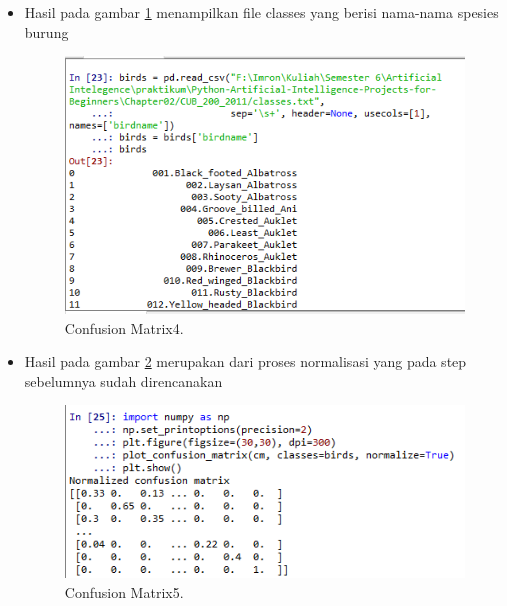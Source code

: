 \begin{enumerate}
\begin{itemize}
\item Hasil pada gambar \ref{mat4} menampilkan file classes yang berisi nama-nama spesies burung 
 		\begin{figure}[ht]
		\centerline{\includegraphics[width=1\textwidth]{figures/im/mat4.png}}
		\caption{Confusion Matrix4.}
		\label{mat4}
		\end{figure}

\item Hasil pada gambar \ref{mat5} merupakan dari proses normalisasi yang pada step sebelumnya sudah direncanakan
 		\begin{figure}[ht]
		\centerline{\includegraphics[width=1\textwidth]{figures/im/mat5.png}}
		\caption{Confusion Matrix5.}
		\label{mat5}
		\end{figure}
\end{itemize}


\end{enumerate}
